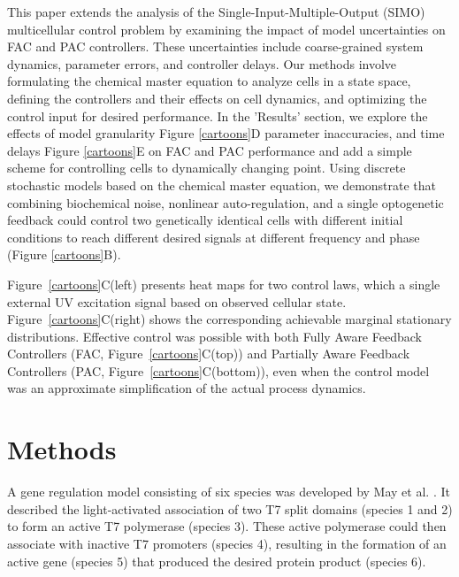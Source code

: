 \documentclass[12pt]{article}
\begin{document}

This paper extends the analysis of the Single-Input-Multiple-Output (SIMO) multicellular control problem by examining the impact of model uncertainties on FAC and PAC controllers. These uncertainties include coarse-grained system dynamics, parameter errors, and controller delays. Our methods involve formulating the chemical master equation to analyze cells in a state space, defining the controllers and their effects on cell dynamics, and optimizing the control input for desired performance. In the 'Results' section, we explore the effects of model granularity Figure \ref{cartoons}D parameter inaccuracies, and time delays Figure \ref{cartoons}E on FAC and PAC performance and add a simple scheme for controlling cells to dynamically changing point. Using discrete stochastic models based on the chemical master equation, we demonstrate that combining biochemical noise, nonlinear auto-regulation, and a single optogenetic feedback could control two genetically identical cells with different initial conditions to reach different desired signals at different frequency and phase (Figure \ref{cartoons}B). 

Figure\ \ref{cartoons}C(left) presents heat maps for two control laws, which a single external UV excitation signal based on observed cellular state.  Figure\ \ref{cartoons}C(right) shows the corresponding achievable marginal stationary distributions. Effective control was possible with both Fully Aware Feedback Controllers (FAC, Figure\ \ref{cartoons}C(top)) and Partially Aware Feedback Controllers (PAC, Figure\ \ref{cartoons}C(bottom)), even when the control model was an approximate simplification of the actual process dynamics.

\section{Methods}
A gene regulation model consisting of six species was developed by May et al. \cite{May2021}. It described the light-activated association of two T7 split domains (species 1 and 2) to form an active T7 polymerase (species 3). These active polymerase could then associate with inactive T7 promoters (species 4), resulting in the formation of an active gene (species 5) that produced the desired protein product (species 6).
\end{document}
